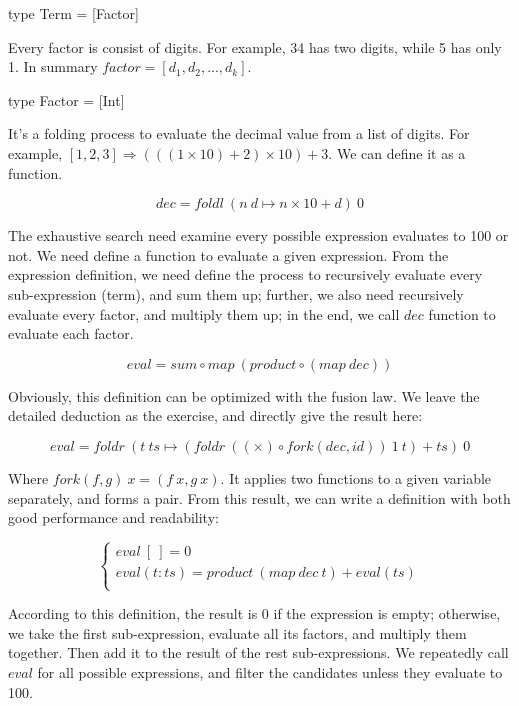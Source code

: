 \documentclass[b5paper]{article}
\begin{document}
\begin{Haskell}
type Term = [Factor]
\end{Haskell}

Every factor is consist of digits. For example, 34 has two digits, while 5 has only 1. In summary $\textit{factor} = [d_1, d_2, ..., d_k]$.

\begin{Haskell}
type Factor = [Int]
\end{Haskell}

It's a folding process to evaluate the decimal value from a list of digits. For example, $[1, 2, 3] \Rightarrow (((1 \times 10) + 2) \times 10) + 3$. We can define it as a function.

\[
dec = foldl\ (n\ d \mapsto n \times 10 + d)\ 0
\]

The exhaustive search need examine every possible expression evaluates to 100 or not. We need define a function to evaluate a given expression. From the expression definition, we need define the process to recursively evaluate every sub-expression (term), and sum them up; further, we also need recursively evaluate every factor, and multiply them up; in the end, we call $dec$ function to evaluate each factor.

\[
eval = sum \circ map\ (product \circ (map\ dec))
\]

Obviously, this definition can be optimized with the fusion law. We leave the detailed deduction as the exercise, and directly give the result here:

\[
eval = foldr\ (t\ ts \mapsto (foldr\ ((\times) \circ fork(dec, id))\ 1\ t) + ts)\ 0
\]

Where $fork(f, g)\ x = (f\ x, g\ x)$. It applies two functions to a given variable separately, and forms a pair. From this result, we can write a definition with both good performance and readability:

\[
\begin{cases}
eval\ [\ ] = 0 \\
eval (t:ts) = product\ (map\ dec\ t) + eval(ts) \\
\end{cases}
\]

According to this definition, the result is 0 if the expression is empty; otherwise, we take the first sub-expression, evaluate all its factors, and multiply them together. Then add it to the result of the rest sub-expressions. We repeatedly call $eval$ for all possible expressions, and filter the candidates unless they evaluate to 100.
\end{document}
